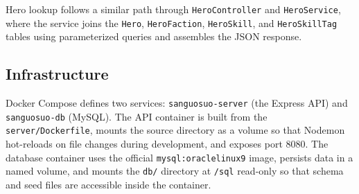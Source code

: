 Hero lookup follows a similar path through \texttt{HeroController} and \texttt{HeroService}, where the service joins the \texttt{Hero}, \texttt{HeroFaction}, \texttt{HeroSkill}, and \texttt{HeroSkillTag} tables using parameterized queries and assembles the JSON response.

\subsection{Infrastructure}

Docker Compose defines two services: \texttt{sanguosuo-server} (the Express API) and \texttt{sanguosuo-db} (MySQL). The API container is built from the \texttt{server/Dockerfile}, mounts the source directory as a volume so that Nodemon hot-reloads on file changes during development, and exposes port 8080. The database container uses the official \texttt{mysql:oraclelinux9} image, persists data in a named volume, and mounts the \texttt{db/} directory at \texttt{/sql} read-only so that schema and seed files are accessible inside the container.

